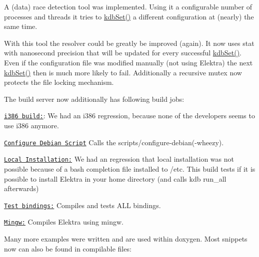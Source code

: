 A (data) race detection tool was implemented. Using it a configurable number of processes and threads it tries to \hyperlink{group__kdb_ga11436b058408f83d303ca5e996832bcf}{kdb\+Set()} a different configuration at (nearly) the same time.

With this tool the resolver could be greatly be improved (again). It now uses stat with nanosecond precision that will be updated for every successful \hyperlink{group__kdb_ga11436b058408f83d303ca5e996832bcf}{kdb\+Set()}. Even if the configuration file was modified manually (not using Elektra) the next \hyperlink{group__kdb_ga11436b058408f83d303ca5e996832bcf}{kdb\+Set()} then is much more likely to fail. Additionally a recursive mutex now protects the file locking mechanism.

The build server now additionally has following build jobs\+:


\begin{DoxyItemize}
\item \href{http://build.libelektra.org:8080/job/elektra-gcc-i386/}{\tt i386 build\+:}\+: We had an i386 regression, because none of the developers seems to use i386 anymore.
\item \href{http://build.libelektra.org:8080/job/elektra-gcc-configure-debian/}{\tt Configure Debian Script} Calls the scripts/configure-\/debian(-\/wheezy).
\item \href{http://build.libelektra.org:8080/job/elektra-local-installation/}{\tt Local Installation\+:} We had an regression that local installation was not possible because of a bash completion file installed to /etc. This build tests if it is possible to install Elektra in your home directory (and calls kdb run\+\_\+all afterwards)
\item \href{http://build.libelektra.org:8080/job/elektra-test-bindings/}{\tt Test bindings\+:} Compiles and tests A\+L\+L bindings.
\item \href{http://build.libelektra.org:8080/job/elektra-gcc-configure-mingw-w64/}{\tt Mingw\+:} Compiles Elektra using mingw.
\end{DoxyItemize}

Many more examples were written and are used within doxygen. Most snippets now can also be found in compilable files\+:


